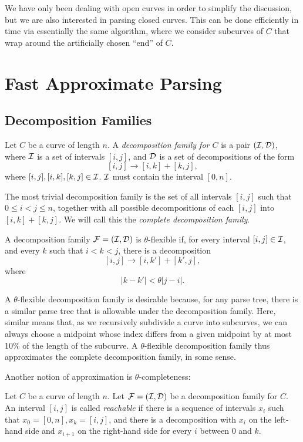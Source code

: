 \documentclass{article}
\def\m{\ema}
\begin{document}
We have only been dealing with open curves in order to simplify the
discussion, but we are also interested in parsing closed curves. This
can be done efficiently in time \m{O(|\RRR|\cdot |C|^3)} via
essentially the same algorithm, where we consider subcurves of $C$
that wrap around the artificially chosen ``end'' of $C$.

\section{Fast Approximate Parsing}
\label{sec-fast-parsing}

\subsection{Decomposition Families}

\begin{defn}
  Let $C$ be a curve of length $n$.  A {\em decomposition family for
    $C$} is a pair $({\mathcal I}, {\mathcal D})$, where ${\mathcal I}$ is a set of intervals
  $[i,j]$, and ${\mathcal D}$ is a set of decompositions of the form
$$[i,j] \to [i,k] + [k,j],$$ where $[i,j], [i,k], [k,j]\in {\mathcal I}$. ${\mathcal I}$
must contain the interval $[0,n]$.
\end{defn}

The most trivial decomposition family is the set of all intervals
$[i,j]$ such that $0\le i < j \le n$, together with all possible
decompositions of each $[i,j]$ into $[i,k] + [k,j]$. We will call this
the {\em complete decomposition family}.

\begin{defn}
  A decomposition family ${\mathcal F}=({\mathcal I},{\mathcal D})$ is $\theta$-flexible if,
  for every interval $[i,j]\in {\mathcal I}$, and every $k$ such that $i<k<j$,
  there is a decomposition
$$[i,j] \to [i,k'] + [k',j],$$
where 
$$|k-k'| < \theta |j-i|.$$
\end{defn}
A $\theta$-flexible decomposition family is desirable because, for any
parse tree, there is a similar parse tree that is allowable under the
decomposition family. Here, similar means that, as we recursively
subdivide a curve into subcurves, we can always choose a midpoint
whose index differs from a given midpoint by at most 10\% of the
length of the subcurve. A $\theta$-flexible decomposition family thus
approximates the complete decomposition family, in some sense.

Another notion of approximation is $\theta$-completeness:
\begin{defn}
  Let $C$ be a curve of length $n$. Let ${\mathcal F}=({\mathcal I},{\mathcal D})$ be a
  decomposition family for $C$.  An interval $[i,j]$ is called {\em
    reachable} if there is a sequence of intervals $x_i$ such that
  $x_0=[0,n], x_k=[i,j]$, and there is a decomposition with $x_i$ on
  the left-hand side and $x_{i+1}$ on the right-hand side for every
  $i$ between $0$ and $k$.
\end{defn}
\end{document}
